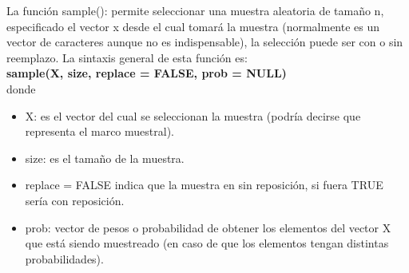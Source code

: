 \documentclass[12pt,letterpaper]{article}\usepackage[]{graphicx}\usepackage[]{color}
\begin{document}
La funci\'on sample(): permite seleccionar una muestra aleatoria de tama\~no n, especificado el vector x desde el cual tomar\'a la muestra (normalmente es un vector de caracteres aunque no es indispensable), la selecci\'on puede ser con o sin reemplazo. La sintaxis general de esta funci\'on es:\\

\textbf{ sample(X, size, replace = FALSE, prob = NULL)}\\

donde\\
\begin{itemize}
\item X: es el vector del cual se seleccionan la muestra (podr\'ia decirse que representa el marco muestral).
\item size: es el tama\~no de la muestra.
\item replace = FALSE indica que la muestra en sin reposici\'on, si fuera TRUE ser\'ia con reposici\'on.
\item prob: vector de pesos o probabilidad de obtener los elementos del vector X que est\'a siendo muestreado (en caso de que los elementos tengan distintas probabilidades). 
\end{itemize}
\end{document}
